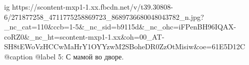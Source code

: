 
 
 
 
 

\ifcmt
  ig https://scontent-mxp1-1.xx.fbcdn.net/v/t39.30808-6/271877258_4711775258869723_8689736680048043782_n.jpg?_nc_cat=110&ccb=1-5&_nc_sid=b9115d&_nc_ohc=iFPenBH96IQAX-coRZ0&_nc_ht=scontent-mxp1-1.xx&oh=00_AT-SH8tEWoVzHCCwMaHrY1OYYzwM2SBoheDR0ZzOtMisiw&oe=61E5D12C
  @caption @label 5: С мамой во дворе.
\fi
